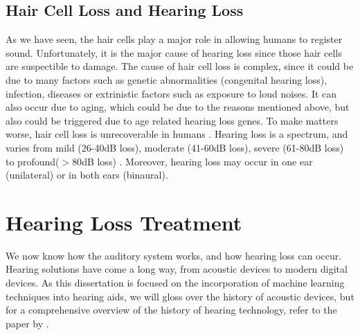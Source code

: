 \documentclass[logo,bsc,singlespacing,parskip,online]{infthesis}
\begin{document}
\subsection{Hair Cell Loss and Hearing Loss}
As we have seen, the hair cells play a major role in allowing humans to register sound. Unfortunately,
it is the major cause of hearing loss since those hair cells are suspectible to damage.
The cause of hair cell loss is complex, since it could be due to many factors such as 
genetic abnormalities (congenital hearing loss), infection, diseases or extrinistic factors such as exposure to loud noises.
It can also occur due to aging, which could be due to the reasons mentioned above, but also 
could be triggered due to age related hearing loss genes. To make matters worse, hair cell loss is unrecoverable in humans \citep{Furness2015HairCell}.
Hearing loss is a spectrum, and varies from mild (26-40dB loss), moderate (41-60dB loss), severe (61-80dB loss) to profound($>80$dB loss) \citep{Nieman2020HearingLoss}.
Moreover, hearing loss may occur in one ear (unilateral) or in both ears (binaural). 

\section{Hearing Loss Treatment}

We now know how the auditory system works, and how hearing loss can occur.
Hearing solutions have come a long way, 
from acoustic devices to modern digital devices. 
As this dissertation is focused on 
the incorporation of machine learning techniques into hearing aids,
we will gloss over the history of acoustic devices, but 
for a comprehensive overview of the history of hearing technology,
refer to the paper by \citet{levitt_historical_2007}.


\end{document}
